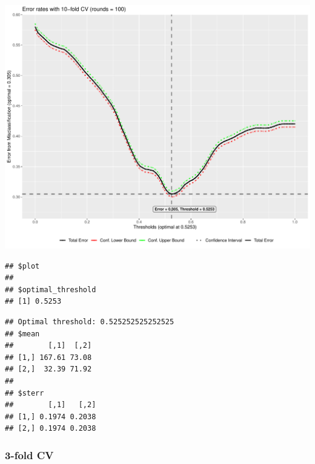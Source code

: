 \documentclass[
  11pt,
  a4paper,
]{scrartcl}
\begin{document}
\begin{center}\includegraphics{figure/analysis-glm-10cv-plot-1} \end{center}

\begin{verbatim}
## $plot
## 
## $optimal_threshold
## [1] 0.5253
\end{verbatim}

\begin{verbatim}
## Optimal threshold: 0.525252525252525
## $mean
##        [,1]  [,2]
## [1,] 167.61 73.08
## [2,]  32.39 71.92
## 
## $sterr
##        [,1]   [,2]
## [1,] 0.1974 0.2038
## [2,] 0.1974 0.2038
\end{verbatim}

\newpage

\hypertarget{fold-cv-1}{%
\subsubsection{3-fold CV}\label{fold-cv-1}}
\end{document}
